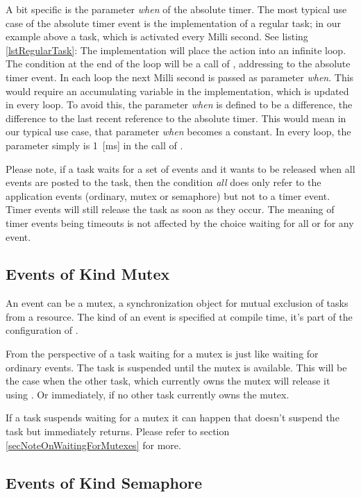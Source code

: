 A bit specific is the parameter \emph{when} of the absolute timer. The
most typical use case of the absolute timer event is the implementation of
a regular task; in our example above a task, which is activated every
Milli second. See listing \ref{lstRegularTask}: The implementation will
place the action into an infinite loop. The  condition at the
end of the loop will be a call of , addressing
to the absolute timer event. In each loop the next Milli second is passed
as parameter \emph{when}. This would require an accumulating variable in
the implementation, which is updated in every loop. To avoid this, the
parameter \emph{when} is defined to be a difference, the difference to the
last recent reference to the absolute timer. This would mean in our typical
use case, that parameter \emph{when} becomes a constant. In every loop,
the parameter simply is 1~[ms] in the call of .

Please note, if a task waits for a set of events and it wants to be
released when all events are posted to the task, then the condition
\emph{all} does only refer to the application events (ordinary, mutex or
semaphore) but not to a timer event. Timer events will still release the
task as soon as they occur. The meaning of timer events being timeouts is
not affected by the choice waiting for all or for any event.


\subsection{Events of Kind Mutex}

An event can be a mutex, a synchronization object for mutual exclusion
of tasks from a resource. The kind of an event is specified at compile
time, it's part of the configuration of \rtos.

From the perspective of a task waiting for a mutex is just like waiting
for ordinary events. The task is suspended until the mutex is available.
This will be the case when the other task, which currently owns the mutex
will release it using . Or immediately, if no other
task currently owns the mutex. 

If a task suspends waiting for a mutex it can happen that
 doesn't suspend the task but immediately
returns. Please refer to section \ref{secNoteOnWaitingForMutexes} for
more.


\subsection{Events of Kind Semaphore}
\label{secWaitForSemaphores}


